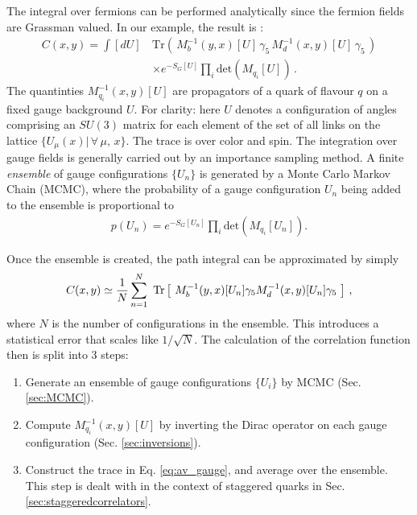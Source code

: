 The integral over fermions can be performed analytically since the fermion fields are Grassman valued. In our example, the result is \cite{Peskin:1995ev}:
\begin{align}
  \nonumber
  C(x,y) = \int [dU]\, &\text{Tr}\left( \, M^{-1}_b(y,x)[U] \, \gamma_5 \, M^{-1}_d(x,y)[U] \, \gamma_5 \, \right) \\ &\times e^{-S_G[U]} \prod_i\text{det}(M_{q_i}[U])\,.
  \label{eq:lattice_correlator}
\end{align}
The quantinties $M_{q_i}^{-1}(x,y)[U]$ are propagators of a quark of flavour $q$ on a fixed gauge background $U$. For clarity: here $U$ denotes a configuration of angles comprising an $SU(3)$ matrix for each element of the set of all links on the lattice $\{ U_{\mu}(x) | \,\forall \,\mu,\,x \}$. The trace is over color and spin. The integration over gauge fields is generally carried out by an importance sampling method. A finite \textit{ensemble} of gauge configurations $\{U_n\}$ is generated by a Monte Carlo Markov Chain (MCMC), where the probability of a gauge configuration $U_n$ being added to the ensemble is proportional to
\begin{align}
  p(U_n) = e^{-S_G[U_n]}\prod_i\text{det}(M_{q_i}[U_n]).
  \label{eq:MCweight}
\end{align}

Once the ensemble is created, the path integral can be approximated by simply
\begin{align}
  C(x,y) \simeq {1\over N} \sum^N_{n=1} \text{ Tr}\left[\text{ } M^{-1}_b(y,x)[U_n] \gamma_5 M^{-1}_d(x,y)[U_n] \gamma_5 \text{ }\right]\,,
  \label{eq:av_gauge}
\end{align}
where $N$ is the number of configurations in the ensemble. This introduces a statistical error that scales like $1/\sqrt{N}$. The calculation of the correlation function then is split into 3 steps:
\begin{enumerate}
\item
  Generate an ensemble of gauge configurations $\{ U_i \}$ by MCMC (Sec. \ref{sec:MCMC}).
\item
  Compute $M^{-1}_{q_i}(x,y)[U]$ by inverting the Dirac operator on each gauge configuration (Sec. \ref{sec:inversions}).
\item
  Construct the trace in Eq. \eqref{eq:av_gauge}, and average over the ensemble. This step is dealt with in the context of staggered quarks in Sec. \ref{sec:staggeredcorrelators}.
\end{enumerate}


